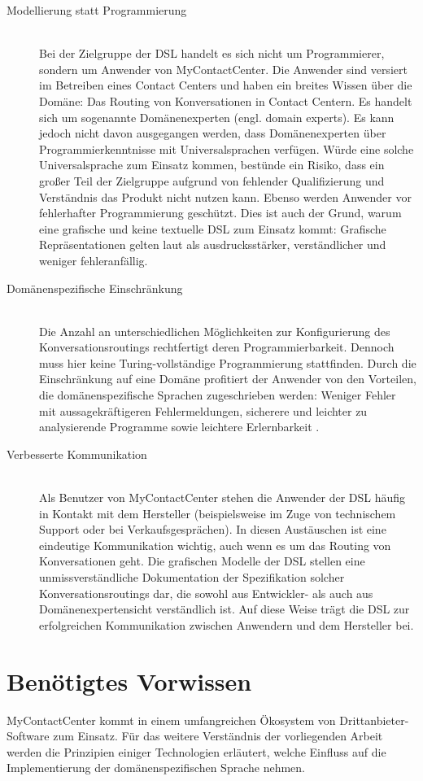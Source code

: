 \begin{description}
\item[Modellierung statt Programmierung] \hfill \\
Bei der Zielgruppe der DSL handelt es sich nicht um Programmierer, sondern um Anwender von MyContactCenter. Die Anwender sind versiert im Betreiben eines Contact Centers und haben ein breites Wissen über die Domäne: Das Routing von Konversationen in Contact Centern. Es handelt sich um sogenannte Domänenexperten (engl. domain experts). Es kann jedoch nicht davon ausgegangen werden, dass Domänenexperten über Programmierkenntnisse mit Universalsprachen verfügen. Würde eine solche Universalsprache zum Einsatz kommen, bestünde ein Risiko, dass ein großer Teil der Zielgruppe aufgrund von fehlender Qualifizierung und Verständnis das Produkt nicht nutzen kann. Ebenso werden Anwender vor fehlerhafter Programmierung geschützt. Dies ist auch der Grund, warum eine grafische und keine textuelle DSL zum Einsatz kommt: Grafische Repräsentationen gelten laut \cite[S. 50f]{Kelly:08} als ausdrucksstärker, verständlicher und weniger fehleranfällig.
\item[Domänenspezifische Einschränkung] \hfill \\
Die Anzahl an unterschiedlichen Möglichkeiten zur Konfigurierung des Konversationsroutings rechtfertigt deren Programmierbarkeit. Dennoch muss hier keine Turing-vollständige Programmierung stattfinden. Durch die Einschränkung auf eine Domäne profitiert der Anwender von den Vorteilen, die domänenspezifische Sprachen zugeschrieben werden: Weniger Fehler mit aussagekräftigeren Fehlermeldungen, sicherere und leichter zu analysierende Programme sowie leichtere Erlernbarkeit \cite{Tomassetti:17}.
\item[Verbesserte Kommunikation] \hfill \\
Als Benutzer von MyContactCenter stehen die Anwender der DSL häufig in Kontakt mit dem Hersteller (beispielsweise im Zuge von technischem Support oder bei Verkaufsgesprächen). In diesen Austäuschen ist eine eindeutige Kommunikation wichtig, auch wenn es um das Routing von Konversationen geht. Die grafischen Modelle der DSL stellen eine unmissverständliche Dokumentation der Spezifikation solcher Konversationsroutings dar, die sowohl aus Entwickler- als auch aus Domänenexpertensicht verständlich ist. Auf diese Weise trägt die DSL zur erfolgreichen Kommunikation zwischen Anwendern und dem Hersteller bei.
\end{description}


\section{Benötigtes Vorwissen}
MyContactCenter kommt in einem umfangreichen Ökosystem von Drittanbieter-Software zum Einsatz. Für das weitere Verständnis der vorliegenden Arbeit werden die Prinzipien einiger Technologien erläutert, welche Einfluss auf die Implementierung der domänenspezifischen Sprache nehmen. 

